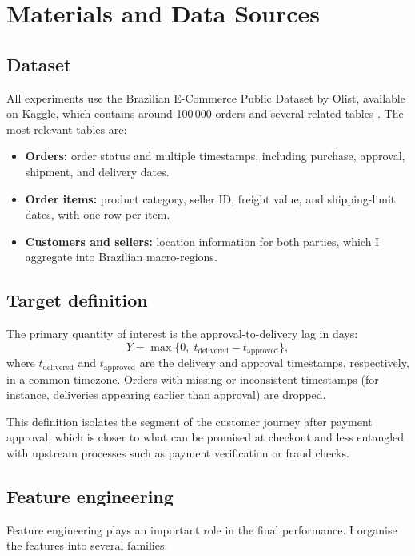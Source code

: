 \documentclass[12pt]{article}
\begin{document}
\section{Materials and Data Sources}

\subsection{Dataset}
All experiments use the Brazilian E-Commerce Public Dataset by Olist, available on Kaggle, which contains around 100\,000 orders and several related tables \citep{olistdataset}. The most relevant tables are:
\begin{itemize}
  \item \textbf{Orders:} order status and multiple timestamps, including purchase, approval, shipment, and delivery dates.
  \item \textbf{Order items:} product category, seller ID, freight value, and shipping-limit dates, with one row per item.
  \item \textbf{Customers and sellers:} location information for both parties, which I aggregate into Brazilian macro-regions.
\end{itemize}

\subsection{Target definition}
The primary quantity of interest is the approval-to-delivery lag in days:
\begin{equation}
  Y = \max\bigl\{0,\; t_{\text{delivered}} - t_{\text{approved}}\bigr\},
\end{equation}
where $t_{\text{delivered}}$ and $t_{\text{approved}}$ are the delivery and approval timestamps, respectively, in a common timezone. Orders with missing or inconsistent timestamps (for instance, deliveries appearing earlier than approval) are dropped.

This definition isolates the segment of the customer journey after payment approval, which is closer to what can be promised at checkout and less entangled with upstream processes such as payment verification or fraud checks.

\subsection{Feature engineering}
Feature engineering plays an important role in the final performance. I organise the features into several families:
\end{document}
